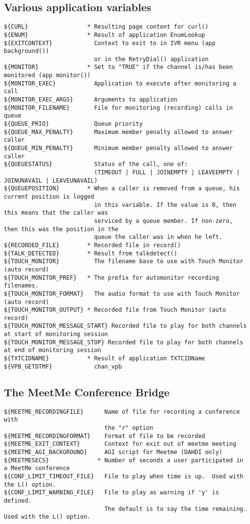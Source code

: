 \subsection{Various application variables}
\begin{verbatim}
${CURL}                 * Resulting page content for curl()
${ENUM}                 * Result of application EnumLookup
${EXITCONTEXT}            Context to exit to in IVR menu (app background())
                          or in the RetryDial() application
${MONITOR}              * Set to "TRUE" if the channel is/has been monitored (app monitor())
${MONITOR_EXEC}           Application to execute after monitoring a call
${MONITOR_EXEC_ARGS}      Arguments to application
${MONITOR_FILENAME}       File for monitoring (recording) calls in queue
${QUEUE_PRIO}             Queue priority
${QUEUE_MAX_PENALTY}      Maximum member penalty allowed to answer caller
${QUEUE_MIN_PENALTY}      Minimum member penalty allowed to answer caller
${QUEUESTATUS}            Status of the call, one of:
                          (TIMEOUT | FULL | JOINEMPTY | LEAVEEMPTY | JOINUNAVAIL | LEAVEUNAVAIL)
${QUEUEPOSITION}        * When a caller is removed from a queue, his current position is logged
                          in this variable. If the value is 0, then this means that the caller was
						  serviced by a queue member. If non-zero, then this was the position in the
						  queue the caller was in when he left.
${RECORDED_FILE}        * Recorded file in record()
${TALK_DETECTED}        * Result from talkdetect()
${TOUCH_MONITOR}          The filename base to use with Touch Monitor (auto record)
${TOUCH_MONITOR_PREF}   * The prefix for automonitor recording filenames.
${TOUCH_MONITOR_FORMAT}   The audio format to use with Touch Monitor (auto record)
${TOUCH_MONITOR_OUTPUT} * Recorded file from Touch Monitor (auto record)
${TOUCH_MONITOR_MESSAGE_START} Recorded file to play for both channels at start of monitoring session
${TOUCH_MONITOR_MESSAGE_STOP} Recorded file to play for both channels at end of monitoring session
${TXTCIDNAME}           * Result of application TXTCIDName
${VPB_GETDTMF}            chan_vpb
\end{verbatim}

\subsection{The MeetMe Conference Bridge}
\begin{verbatim}
${MEETME_RECORDINGFILE}      Name of file for recording a conference with
                             the "r" option
${MEETME_RECORDINGFORMAT}    Format of file to be recorded
${MEETME_EXIT_CONTEXT}       Context for exit out of meetme meeting
${MEETME_AGI_BACKGROUND}     AGI script for Meetme (DAHDI only)
${MEETMESECS}              * Number of seconds a user participated in a MeetMe conference
${CONF_LIMIT_TIMEOUT_FILE}   File to play when time is up.  Used with the L() option.
${CONF_LIMIT_WARNING_FILE}   File to play as warning if 'y' is defined.
                             The default is to say the time remaining.  Used with the L() option.
\end{verbatim}

